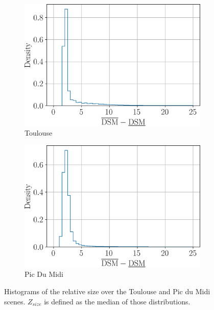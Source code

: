 \begin{figure}
    \centering
    \begin{subfigure}[t]{0.49\linewidth}
        \flushleft
        \includegraphics[width=\linewidth]{Images/Chap_6/histogram_elevation_s_rel_Toulouse.png}
        \caption{Toulouse}
        \label{fig:size_hist}
    \end{subfigure}\hfill
    \begin{subfigure}[t]{0.49\linewidth}
        \flushright
        \includegraphics[width=\linewidth]{Images/Chap_6/histogram_elevation_s_rel_Pic_du_midi.png}
        \caption{Pic Du Midi}
        \label{fig:size_hist_pic_du_midi}
    \end{subfigure}
    \caption{Histograms of the relative size over the Toulouse and Pic du Midi scenes. $Z_{size}$ is defined as the median of those distributions.}
    \label{fig:histogram_elevation_size}
\end{figure}


